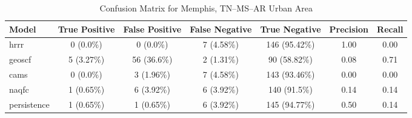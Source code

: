 \begin{table}[h!]
\centering
\begin{tabular}{lcccccc}
\hline
Model & True Positive & False Positive & False Negative & True Negative & Precision & Recall\\ \hline
hrrr & 0 (0.0\%) & 0 (0.0\%) & 7 (4.58\%) & 146 (95.42\%) & \cellcolor{green!25}1.00 & \cellcolor{red!25}0.00 \\ 
geoscf & 5 (3.27\%) & 56 (36.6\%) & 2 (1.31\%) & 90 (58.82\%) & \cellcolor{red!25}0.08 & \cellcolor{green!25}0.71 \\ 
cams & 0 (0.0\%) & 3 (1.96\%) & 7 (4.58\%) & 143 (93.46\%) & \cellcolor{red!25}0.00 & \cellcolor{red!25}0.00 \\ 
naqfc & 1 (0.65\%) & 6 (3.92\%) & 6 (3.92\%) & 140 (91.5\%) & \cellcolor{red!25}0.14 & \cellcolor{green!25}0.14 \\ 
persistence & 1 (0.65\%) & 1 (0.65\%) & 6 (3.92\%) & 145 (94.77\%) & 0.50 & 0.14 \\ 
\hline
\end{tabular}
\caption{Confusion Matrix for Memphis, TN--MS--AR Urban Area}
\end{table}
